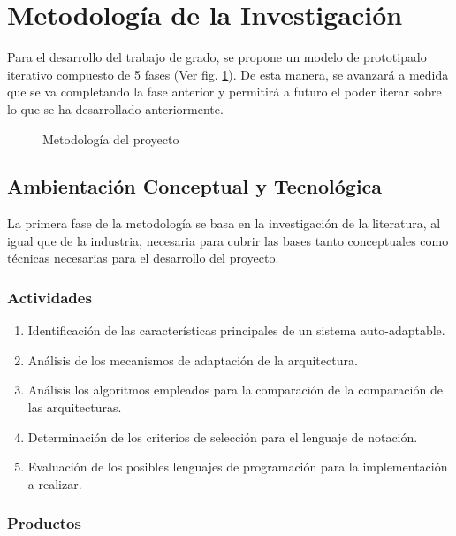 \section{Metodología de la Investigación}

Para el desarrollo del trabajo de grado, se propone un modelo de prototipado iterativo compuesto de 5 fases (Ver fig. \ref{fig:met}). De esta manera, se avanzará a medida que se va completando la fase anterior y permitirá a futuro el poder iterar sobre lo que se ha desarrollado anteriormente.

\begin{figure}[H]
    \centering
    
    \caption{Metodología del proyecto}
    \label{fig:met}
\end{figure}

\subsection{Ambientación Conceptual y Tecnológica}

La primera fase de la metodología se basa en la investigación de la literatura, al igual que de la industria, necesaria para cubrir las bases tanto conceptuales como técnicas necesarias para el desarrollo del proyecto. 

\subsubsection*{Actividades}

\begin{enumerate}
    \itemsep-2mm
    \item Identificación de las características principales de un sistema auto-adaptable.
    \item Análisis de los mecanismos de adaptación de la arquitectura.
    \item Análisis los algoritmos empleados para la comparación de la comparación de las arquitecturas.
    \item Determinación de los criterios de selección para el lenguaje de notación.
    \item Evaluación de los posibles lenguajes de programación para la implementación a realizar.
\end{enumerate} 

\subsubsection*{Productos}

